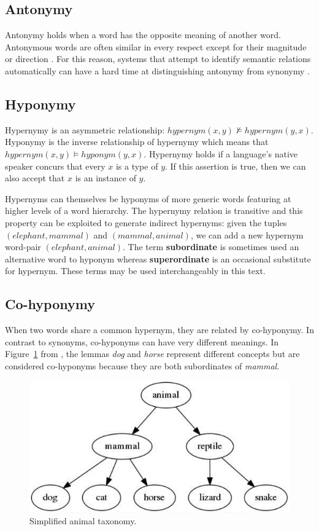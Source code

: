 \subsection{Antonymy}
Antonymy holds when a word has the opposite meaning of another word.  Antonymous words are often similar in every respect except for their magnitude or direction \citep{Jurafsky2009}.  For this reason, systems that attempt to identify semantic relations automatically can have a hard time at distinguishing antonymy from synonymy \citep{Jurafsky2009}.

\subsection{Hyponymy}
Hypernymy is an asymmetric relationship: \(hypernym(x, y) \nvDash hypernym(y, x)\).  Hyponymy is the inverse relationship of hypernymy which means that \(hypernym(x, y) \vDash hyponym(y, x)\).  Hypernymy holds if a language’s native speaker concurs that every \(x\) is a type of \(y\).  If this assertion is true, then we can also accept that \(x\) is an instance of \(y\).   

Hypernyms can themselves be hyponyms of more generic words featuring at higher levels of a word hierarchy.  The hypernymy relation is transitive and this property can be exploited to generate indirect hypernyms: given the tuples \((elephant, mammal)\) and \((mammal, animal)\), we can add a new hypernym word-pair \((elephant, animal)\).  The term \textbf{subordinate} is sometimes used an alternative word to hyponym whereas \textbf{superordinate} is an occasional substitute for hypernym.  These terms may be used interchangeably in this text.

\subsection{Co-hyponymy}
When two words share a common hypernym, they are related by co-hyponymy.  In contrast to synonyms, co-hyponyms can have very different meanings.  In Figure~\ref{fig:simple_taxon} from \citet{camacho2017we}, the lemmas \textit{dog} and  \textit{horse} represent different concepts but are considered co-hyponyms because they are both subordinates of \textit{mammal}.
\begin{figure}[ht!] %
  \centering
  \includegraphics[width=0.6\linewidth]{images/simplified_animal_taxonomy.png}
  \caption{Simplified animal taxonomy.}
  \label{fig:simple_taxon}
\end{figure}

